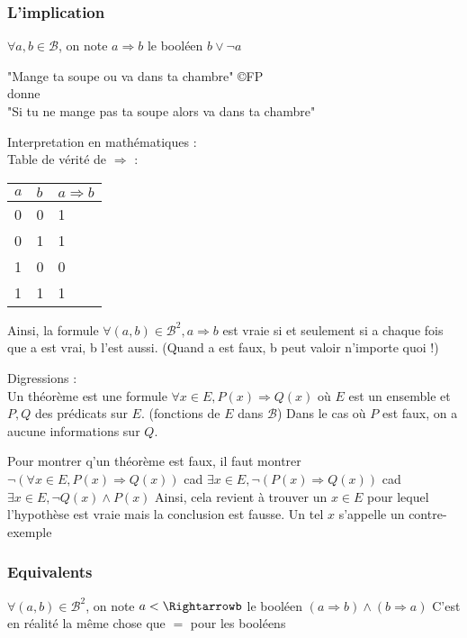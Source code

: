 \subsubsection{L'implication}
\begin{defi}
    $\forall a,b \in \mathcal{B}$, on note $a\Rightarrow b$ le booléen $b\lor\lnot a$
\end{defi}

\begin{ex}
    "Mange ta soupe ou va dans ta chambre"  \copyright FP\\
    donne \\
    "Si tu ne mange pas ta soupe alors va dans ta chambre"\\
\end{ex}

Interpretation en mathématiques :\\
Table de vérité de $\Rightarrow$ :

    \begin{tabular}{|l|l|l|} 
    \hline
    $a$ & $b$ & $a\Rightarrow b$ \\ \hline
    0   & 0   & 1                \\ \hline
    0   & 1   & 1                \\ \hline
    1   & 0   & 0                \\ \hline
    1   & 1   & 1     \\ \hline          
    \end{tabular}


Ainsi, la formule $\forall (a,b) \in \mathcal{B}^2, a \Rightarrow b$ est vraie si et seulement si a chaque fois que a est vrai, b l'est aussi. (Quand a est faux, b peut valoir n'importe quoi !)

Digressions : \\
Un théorème est une formule $\forall x \in E, P(x) \Rightarrow Q(x)$ où $E$ est un ensemble et $P,Q$ des prédicats sur $E$. (fonctions de $E$ dans $\mathcal{B}$)
Dans le cas où $P$ est faux, on a aucune informations sur $Q$. 

Pour montrer q'un théorème est faux, il faut montrer
$\lnot(\forall x \in E, P(x) \Rightarrow Q(x))$ cad $\exists x \in E, \lnot(P(x) \Rightarrow Q(x))$ cad $\exists x \in E, \lnot Q(x) \land P(x)$
Ainsi, cela revient à trouver un $x\in E$ pour lequel l'hypothèse est vraie mais la conclusion est fausse. Un tel $x$ s'appelle un contre-exemple

\subsubsection{Equivalents}
\begin{defi}
    $\forall (a,b) \in \mathcal{B}^2$, on note $a<\Rightarrowb$ le booléen $(a\Rightarrow b) \land (b\Rightarrow a)$
    C'est en réalité la même chose que $=$ pour les booléens
\end{defi}


